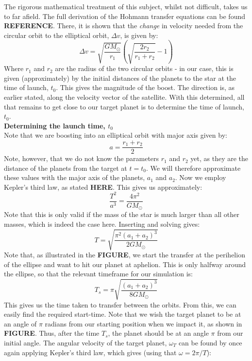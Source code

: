 \documentclass[a4paper,10pt,english]{article}
\begin{document}
\linebreak
The rigorous mathematical treatment of this subject, whilst not difficult, takes us to far afield. The full derivation of the Hohmann transfer equations can be found \textbf{REFERENCE}. There, it is shown that the \textit{change} in velocity needed from the circular orbit to the elliptical orbit, $\Delta v$, is given by:
\begin{equation}\label{eq:Hohmann}
\Delta v=\sqrt{\frac{GM_{\odot}}{r_1}}\left(\sqrt{\frac{2r_2}{r_1+r_2}}-1\right)
\end{equation}
Where $r_1$ and $r_2$ are the radius of the two circular orbits - in our case, this is given (approximately)  by the initial distances of the planets to the star at the time of launch, $t_0$. This gives the magnitude of the boost. The direction is, as earlier stated, along the velocity vector of the satellite. With this determined, all that remains to get close to our target planet is to determine the time of launch, $t_0$.\\
\linebreak
\textbf{Determining the launch time, $t_0$}\\
Note that we are boosting into an elliptical orbit with major axis given by:
$$a=\frac{r_1+r_2}{2}$$
Note, however, that we do not know the parameters $r_1$ and $r_2$ yet, as they are the distance of the planets from the target at $t=t_0$. We will therefore approximate these values with the major axis of the planets, $a_1$ and $a_2$. Now we employ Kepler's third law, as stated \textbf{HERE}. This gives us approximately:
$$\frac{T^2}{a^3}= \frac{4\pi^2}{GM_{\odot}}$$
Note that this is only valid if the mass of the star is much larger than all other masses, which is indeed the case here. Inserting and solving gives:
$$T=\sqrt{\frac{\pi^2(a_1+a_2)^3}{2GM_{\odot}}}$$
Note that, as illustrated in the \textbf{FIGURE}, we start the transfer at the perihelion of the ellipse and want to hit our planet at aphelion. This is only halfway around the ellipse, so that the relevant timeframe for our simulation is:
\begin{equation}\label{eq:orbital_period}
T_s=\pi\sqrt{\frac{(a_1+a_2)^ 3}{8GM_{\odot}}}
\end{equation}
This gives us the time taken to transfer between the orbits. From this, we can easily find the required start-time. Note that we wish the target planet to be at an angle of $\pi$ radians from our starting position when we impact it, as shown in \textbf{FIGURE}. Thus, after the time $T_s$, the planet should be at an angle $\pi$ from our initial angle. The angular velocity of the target planet, $\omega_T$ can be found by once again applying Kepler's third law, which gives (using that $\omega=2\pi/T$):
\end{document}
